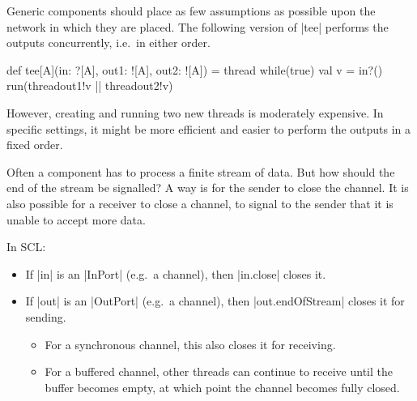 \documentclass[notes,color]{sepslide0}
\begin{document}

\begin{slide}

Generic components should place as few assumptions as possible upon the
network in which they are placed.  The following version of |tee| performs the
outputs concurrently, i.e.~in either order.
%
\begin{scala}
def tee[A](in: ?[A], out1: ![A], out2: ![A]) = thread{
  while(true){ 
    val v = in?()
    run(thread{out1!v} || thread{out2!v}) 
  }
}
\end{scala}

However, creating and running two new threads is moderately expensive.  In
specific settings, it might be more efficient and easier to perform the
outputs in a fixed order.
\end{slide}


\begin{slide}

Often a component has to process a finite stream of data.  But how should the
end of the stream be signalled?
%
A way is for the sender to close the channel. 
%
It is also possible for a receiver to close a channel, to signal to the
sender that it is unable to accept more data. 

In SCL:
%
\begin{itemize}
\item If |in| is an |InPort| (e.g.~a channel), then |in.close| closes it.

\item If |out| is an |OutPort| (e.g.~a channel), then |out.endOfStream| closes
  it for sending. 
  \begin{itemize}
  \item For a synchronous channel, this also closes it for
  receiving.  
  \item For a buffered channel, other threads can continue to
  receive until the buffer becomes empty, at which point the channel becomes
  fully closed.
  \end{itemize}
\end{itemize}
\end{slide}

\end{document}
